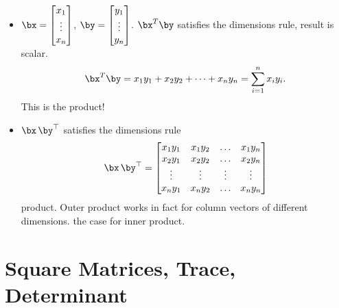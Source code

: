 \documentclass[8pt]{beamer}
\newcommand{\myemph}[1]{{\color{blue}{#1}}}
\begin{document}
\begin{frame}
  \begin{itemize}
  \item  $\bx =
    \begin{bmatrix}
      x_1\\\vdots\\x_n
    \end{bmatrix}$, $\by =
    \begin{bmatrix}
      y_1\\\vdots\\y_n
    \end{bmatrix}$. $\bx^T \by$ satisfies the dimensions rule, result is scalar.
    $$
    \bx^T \by =
    x_1 y_1 + x_2 y_2 + \dots + x_n y_n = \sum_{i=1}^{n} x_i y_i.
    $$
    This is the \myemph{inner} product! 
  \item $\bx\,\by^\top$ satisfies the dimensions rule
    $$
    \bx\,\by^\top =
    \begin{bmatrix}
      x_1 y_1 & x_1 y_2 & \hdots & x_1 y_n\\ 
      x_2 y_1 & x_2 y_2 & \hdots & x_2 y_n\\ 
      \vdots & \vdots &  \vdots & \vdots\\
      x_n y_1 & x_n y_2 & \hdots & x_n y_n\\ 
    \end{bmatrix}
    $$
    \myemph{Outer} product. Outer product works in fact for column
    vectors of different dimensions. \myemph{Not} the case for inner
    product.
  \end{itemize}
\end{frame}


\section{Square Matrices, Trace, Determinant}
\end{document}
